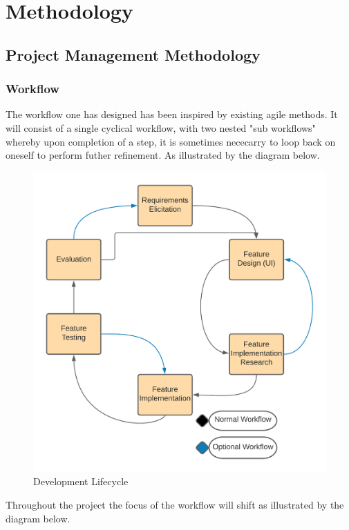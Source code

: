 \chapter{Methodology}
\label{methodology}

\section{Project Management Methodology}
  \subsection{Workflow}
  The workflow one has designed has been inspired by existing agile methods. It will consist of a single cyclical workflow, with two nested "sub workflows" whereby upon completion of a step, it is sometimes nececarry to loop back on oneself to perform futher refinement. As illustrated by the diagram below.
  \begin{figure}
    \begin{center}
      \includegraphics[scale=0.75]{Images/Project_Management_Methodology}
      \caption{Development Lifecycle}
      \label{fig:development lifecycle}
    \end{center}
  \end{figure}
  Throughout the project the focus of the workflow will shift as illustrated by the diagram below.

